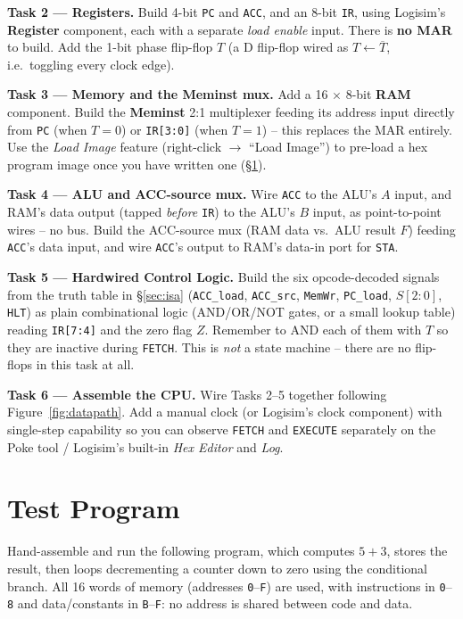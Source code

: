 \documentclass[11pt,a4paper]{article}
\newcommand{\task}[1]{\par\vspace{4pt}\noindent\textbf{Task #1}}
\begin{document}
\task{2 --- Registers.} Build 4-bit \texttt{PC} and \texttt{ACC}, and an
8-bit \texttt{IR}, using Logisim's \textbf{Register} component, each with
a separate \emph{load enable} input. There is \textbf{no MAR} to build.
Add the 1-bit phase flip-flop $T$ (a D flip-flop wired as $T \leftarrow
\overline{T}$, i.e.\ toggling every clock edge).

\task{3 --- Memory and the Meminst mux.} Add a 16 $\times$ 8-bit
\textbf{RAM} component. Build the \textbf{Meminst} 2:1 multiplexer feeding
its address input directly from \texttt{PC} (when $T{=}0$) or
\texttt{IR[3:0]} (when $T{=}1$) -- this replaces the MAR entirely. Use the
\emph{Load Image} feature (right-click $\to$ ``Load Image'') to pre-load a
hex program image once you have written one (\S\ref{sec:testprog}).

\task{4 --- ALU and ACC-source mux.} Wire \texttt{ACC} to the ALU's $A$
input, and RAM's data output (tapped \emph{before} \texttt{IR}) to the
ALU's $B$ input, as point-to-point wires -- no bus. Build the ACC-source
mux (RAM data vs.\ ALU result $F$) feeding \texttt{ACC}'s data input, and
wire \texttt{ACC}'s output to RAM's data-in port for \texttt{STA}.

\task{5 --- Hardwired Control Logic.} Build the six opcode-decoded
signals from the truth table in \S\ref{sec:isa} (\texttt{ACC\_load},
\texttt{ACC\_src}, \texttt{MemWr}, \texttt{PC\_load}, $S[2{:}0]$,
\texttt{HLT}) as plain combinational logic (AND/OR/NOT gates, or a small
lookup table) reading \texttt{IR[7:4]} and the zero flag $Z$. Remember to
AND each of them with $T$ so they are inactive during \texttt{FETCH}.
This is \emph{not} a state machine -- there are no flip-flops in this
task at all.

\task{6 --- Assemble the CPU.} Wire Tasks 2--5 together following
Figure~\ref{fig:datapath}. Add a manual clock (or Logisim's clock
component) with single-step capability so you can observe \texttt{FETCH}
and \texttt{EXECUTE} separately on the Poke tool / Logisim's built-in
\emph{Hex Editor} and \emph{Log}.

\section{Test Program}
\label{sec:testprog}

Hand-assemble and run the following program, which computes $5 + 3$, stores
the result, then loops decrementing a counter down to zero using the
conditional branch. All 16 words of memory (addresses \texttt{0}--\texttt{F})
are used, with instructions in \texttt{0}--\texttt{8} and data/constants in
\texttt{B}--\texttt{F}: no address is shared between code and data.
\end{document}
